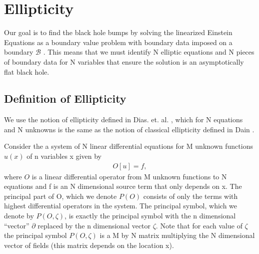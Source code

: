 \documentclass[aps,prd,amsmath,showpacs,amssymb,superscriptaddress,nofootinbib,longbibliography,eqsecnum,preprintnumbers]{revtex4-1}
\begin{document}

\section{Ellipticity}

Our goal is to find the black hole bumps by solving the linearized Einstein Equations as a boundary value problem with boundary data imposed on a boundary $\mathcal B$ . This means that we must identify N elliptic equations and N pieces of boundary data for N variables that ensure the solution is an asymptotically flat black hole. 

\subsection{Definition of Ellipticity}

We use the notion of ellipticity defined in Dias. et. al. \cite{Dias:2015nua}, which for N equations and N unknowns is the same as the notion of classical ellipticity defined in Dain \cite{Dain:2004nt}.

Consider the a system of N linear differential equations for M unknown functions $u(x)$ of n variables x given by 
\begin{align}
 O[u]= f, 
\end{align}
where $O$ is a linear differential operator from M unknown functions to N equations and f is an N dimensional source term that only depends on x. The principal part of O, which we denote $P(O)$ consists of only the terms with highest differential operators in the system. The principal symbol, which we denote by $P(O,\zeta)$, is exactly the principal symbol with the n dimensional ``vector'' $\partial$ replaced by the n dimensional vector $\zeta$. Note that for each value of $\zeta$ the principal symbol $P(O,\zeta)$ is a M by N matrix multiplying the N dimensional vector of fields (this matrix depends on the location x).
\end{document}
